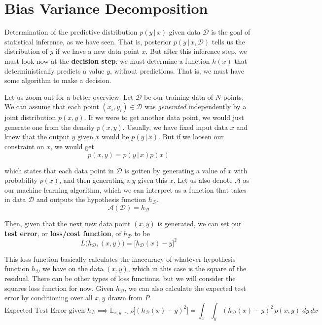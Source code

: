 \documentclass{article}
\begin{document}
\section{Bias Variance Decomposition}

  Determination of the predictive distribution $p(y\,|\,x)$ given data $\mathcal{D}$ is the goal of statistical inference, as we have seen. That is, posterior $p(y\,|\,x, \mathcal{D})$ tells us the distribution of $y$ if we have a new data point $x$. But after this inference step, we must look now at the \textbf{decision step}: we must determine a function $h(x)$ that deterministically predicts a value $y$, without predictions. That is, we must have some algorithm to make a decision.

  Let us zoom out for a better overview. Let $\mathcal{D}$ be our training data of $N$ points. We can assume that each point $(x_i, y_i) \in \mathcal{D}$ was \textit{generated} independently by a joint distribution $p(x, y)$. If we were to get another data point, we would just generate one from the density $p(x, y)$. Usually, we have fixed input data $x$ and knew that the output $y$ given $x$ would be $p(y\,|\,x)$. But if we loosen our constraint on $x$, we would get
  \begin{equation}
    p(x, y) = p(y\,|\,x) p(x)
  \end{equation}

  which states that each data point in $\mathcal{D}$ is gotten by generating a value of $x$ with probability $p(x)$, and then generating a $y$ given this $x$. Let us also denote $\mathcal{A}$ as our machine learning algorithm, which we can interpret as a function that takes in data $\mathcal{D}$ and outputs the hypothesis function $h_\mathcal{D}$.
  \begin{equation}
    \mathcal{A} (\mathcal{D}) = h_\mathcal{D}
  \end{equation}

  Then, given that the next new data point $(x, y)$ is generated, we can set our \textbf{test error}, or \textbf{loss/cost function}, of $h_\mathcal{D}$ to be
  \begin{equation}
    L\big(h_\mathcal{D}, (x, y) \big) = \big[ h_\mathcal{D} (x) - y \big]^2
  \end{equation}

  This loss function basically calculates the inaccuracy of whatever hypothesis function $h_\mathcal{D}$ we have on the data $(x, y)$, which in this case is the square of the residual. There can be other types of loss functions, but we will consider the squares loss function for now. Given $h_\mathcal{D}$, we can also calculate the expected test error by conditioning over all $x, y$ drawn from $P$.
  \begin{equation}
    \text{Expected Test Error given } h_\mathcal{D} \implies \mathbb{E}_{x, y, \sim P} \big[ (h_\mathcal{D} (x) - y)^2 \big] = \int_x \int_y (h_\mathcal{D} (x) - y)^2 \, p(x, y)\; dy \, dx
  \end{equation}
\end{document}
